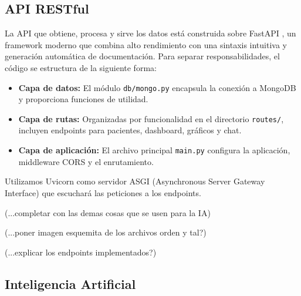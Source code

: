 




\subsection{API RESTful}

La API que obtiene, procesa y sirve los datos está construida sobre FastAPI \cite{fastapi}, un framework moderno que combina alto rendimiento con una sintaxis intuitiva y generación automática de documentación. Para separar responsabilidades, el código se estructura de la siguiente forma:

\begin{itemize}
\item \textbf{Capa de datos:} El módulo \texttt{db/mongo.py} encapsula la conexión a MongoDB y proporciona funciones de utilidad.
\item \textbf{Capa de rutas:} Organizadas por funcionalidad en el directorio \texttt{routes/}, incluyen endpoints para pacientes, dashboard, gráficos y chat.
\item \textbf{Capa de aplicación:} El archivo principal \texttt{main.py} configura la aplicación, middleware CORS y el enrutamiento.
\end{itemize}

Utilizamos Uvicorn como servidor ASGI (Asynchronous Server Gateway Interface) que escuchará las peticiones a los endpoints. 

(...completar con las demas cosas que se usen para la IA)

(...poner imagen esquemita de los archivos orden y tal?)

(...explicar los endpoints implementados?)

\subsection{Inteligencia Artificial}

